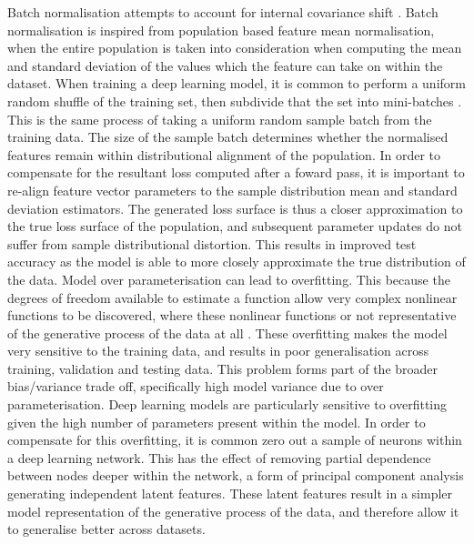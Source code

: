 Batch normalisation attempts to account for internal covariance shift \cite{reference}. Batch normalisation is inspired from population based feature mean normalisation, when the entire population is taken into consideration when computing the mean and standard deviation of the values which the feature can take on within the dataset. When training a deep learning model, it is common to perform a uniform random shuffle of the training set, then subdivide that the set into mini-batches \cite{reference}. This is the same process of taking a uniform random sample batch from the training data. The size of the sample batch determines whether the normalised features remain within distributional alignment of the population. In order to compensate for the resultant loss computed after a foward pass, it is important to re-align feature vector parameters to the sample distribution mean and standard deviation estimators. The generated loss surface is thus a closer approximation to the true loss surface of the population, and subsequent parameter updates do not suffer from sample distributional distortion. This results in improved test accuracy as the model is able to more closely approximate the true distribution of the data. \newline Model over parameterisation can lead to overfitting. This because the degrees of freedom available to estimate a function allow very complex nonlinear functions to be discovered, where these nonlinear functions or not representative of the generative process of the data at all \cite{reference}. These overfitting makes the model very sensitive to the training data, and results in poor generalisation across training, validation and testing data. This problem forms part of the broader bias/variance trade off, specifically high model variance due to over parameterisation. Deep learning models are particularly sensitive to overfitting given the high number of parameters present within the model. In order to compensate for this overfitting, it is common zero out a sample of neurons within a deep learning network. This has the effect of removing partial dependence between nodes deeper within the network, a form of principal component analysis generating independent latent features. These latent features result in a simpler model representation of the generative process of the data, and therefore allow it to generalise better across datasets. 



